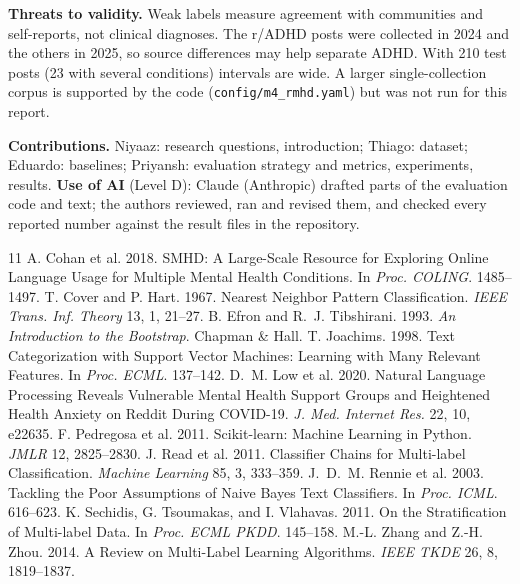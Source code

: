 \documentclass[sigconf]{acmart}
\begin{document}
\textbf{Threats to validity.} Weak labels measure agreement with communities and self-reports, not clinical diagnoses. The r/ADHD posts were collected in 2024 and the others in 2025, so source differences may help separate ADHD. With 210 test posts (23 with several conditions) intervals are wide. A larger single-collection corpus \cite{low2020natural} is supported by the code (\texttt{config/m4\_rmhd.yaml}) but was not run for this report.

\vspace{1mm}\noindent\textbf{Contributions.} Niyaaz: research questions, introduction; Thiago: dataset; Eduardo: baselines; Priyansh: evaluation strategy and metrics, experiments, results. \textbf{Use of AI} (Level D): Claude (Anthropic) drafted parts of the evaluation code and text; the authors reviewed, ran and revised them, and checked every reported number against the result files in the repository.


\renewcommand{\bibfont}{\scriptsize}
\begin{thebibliography}{11}
\setlength{\itemsep}{0pt}
 A. Cohan et al. 2018. SMHD: A Large-Scale Resource for Exploring Online Language Usage for Multiple Mental Health Conditions. In \textit{Proc. COLING}. 1485--1497.
 T. Cover and P. Hart. 1967. Nearest Neighbor Pattern Classification. \textit{IEEE Trans. Inf. Theory} 13, 1, 21--27.
 B. Efron and R.~J. Tibshirani. 1993. \textit{An Introduction to the Bootstrap}. Chapman \& Hall.
 T. Joachims. 1998. Text Categorization with Support Vector Machines: Learning with Many Relevant Features. In \textit{Proc. ECML}. 137--142.
 D.~M. Low et al. 2020. Natural Language Processing Reveals Vulnerable Mental Health Support Groups and Heightened Health Anxiety on Reddit During COVID-19. \textit{J. Med. Internet Res.} 22, 10, e22635.
 F. Pedregosa et al. 2011. Scikit-learn: Machine Learning in Python. \textit{JMLR} 12, 2825--2830.
 J. Read et al. 2011. Classifier Chains for Multi-label Classification. \textit{Machine Learning} 85, 3, 333--359.
 J.~D.~M. Rennie et al. 2003. Tackling the Poor Assumptions of Naive Bayes Text Classifiers. In \textit{Proc. ICML}. 616--623.
 K. Sechidis, G. Tsoumakas, and I. Vlahavas. 2011. On the Stratification of Multi-label Data. In \textit{Proc. ECML PKDD}. 145--158.
 M.-L. Zhang and Z.-H. Zhou. 2014. A Review on Multi-Label Learning Algorithms. \textit{IEEE TKDE} 26, 8, 1819--1837.
\end{thebibliography}
\end{document}
